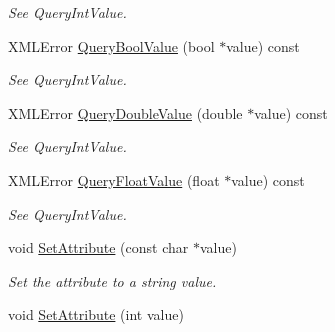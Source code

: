 \begin{DoxyCompactItemize}
\begin{DoxyCompactList}\small\item\em See Query\+Int\+Value. \end{DoxyCompactList}\item 
X\+M\+L\+Error \hyperlink{classtinyxml2_1_1_x_m_l_attribute_a9e9b94369f182df72aaac9acd04afead}{Query\+Bool\+Value} (bool $\ast$value) const \hypertarget{classtinyxml2_1_1_x_m_l_attribute_a9e9b94369f182df72aaac9acd04afead}{}\label{classtinyxml2_1_1_x_m_l_attribute_a9e9b94369f182df72aaac9acd04afead}

\begin{DoxyCompactList}\small\item\em See Query\+Int\+Value. \end{DoxyCompactList}\item 
X\+M\+L\+Error \hyperlink{classtinyxml2_1_1_x_m_l_attribute_a0872c05edea2a7cde4bd96c1e9cb2fc4}{Query\+Double\+Value} (double $\ast$value) const \hypertarget{classtinyxml2_1_1_x_m_l_attribute_a0872c05edea2a7cde4bd96c1e9cb2fc4}{}\label{classtinyxml2_1_1_x_m_l_attribute_a0872c05edea2a7cde4bd96c1e9cb2fc4}

\begin{DoxyCompactList}\small\item\em See Query\+Int\+Value. \end{DoxyCompactList}\item 
X\+M\+L\+Error \hyperlink{classtinyxml2_1_1_x_m_l_attribute_afb254627c296d1d70b755397d32fece8}{Query\+Float\+Value} (float $\ast$value) const \hypertarget{classtinyxml2_1_1_x_m_l_attribute_afb254627c296d1d70b755397d32fece8}{}\label{classtinyxml2_1_1_x_m_l_attribute_afb254627c296d1d70b755397d32fece8}

\begin{DoxyCompactList}\small\item\em See Query\+Int\+Value. \end{DoxyCompactList}\item 
void \hyperlink{classtinyxml2_1_1_x_m_l_attribute_a406d2c4a13c7af99a65edb59dd9f7581}{Set\+Attribute} (const char $\ast$value)\hypertarget{classtinyxml2_1_1_x_m_l_attribute_a406d2c4a13c7af99a65edb59dd9f7581}{}\label{classtinyxml2_1_1_x_m_l_attribute_a406d2c4a13c7af99a65edb59dd9f7581}

\begin{DoxyCompactList}\small\item\em Set the attribute to a string value. \end{DoxyCompactList}\item 
void \hyperlink{classtinyxml2_1_1_x_m_l_attribute_ad86d7d7058d76761c3a80662566a57e5}{Set\+Attribute} (int value)\hypertarget{classtinyxml2_1_1_x_m_l_attribute_ad86d7d7058d76761c3a80662566a57e5}{}\label{classtinyxml2_1_1_x_m_l_attribute_ad86d7d7058d76761c3a80662566a57e5}


\end{DoxyCompactItemize}
